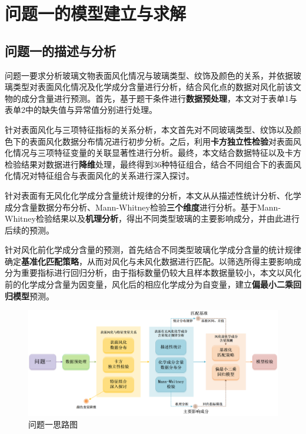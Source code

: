 \documentclass[withoutpreface,bwprint]{cumcmthesis} %
\begin{document}
\section{问题一的模型建立与求解}

\subsection{问题一的描述与分析}

问题一要求分析玻璃文物表面风化情况与玻璃类型、纹饰及颜色的关系，并依据玻璃类型对表面风化情况及化学成分含量进行分析，结合风化点的数据对风化前该文物的成分含量进行预测。首先，基于题干条件进行\textbf{数据预处理}，本文对于表单1与表单2中的缺失值与异常值分别进行处理。

针对表面风化与三项特征指标的关系分析，本文首先对不同玻璃类型、纹饰以及颜色下的表面风化数据分布情况进行初步分析。之后，利用\textbf{卡方独立性检验}对表面风化情况与三项特征变量的关联显著性进行分析。最终，本文结合数据特征以及卡方检验结果对数据进行\textbf{降维}处理，最终得到36种特征组合，结合不同组合下的表面风化情况对特征组合与表面风化的关系进行深入探讨。

针对表面有无风化化学成分含量统计规律的分析，本文从从描述性统计分析、化学成分含量数据分布分析、Mann-Whitney检验\textbf{三个维度}进行分析。基于Mann-Whitney检验结果以及\textbf{机理分析}，得出不同类型玻璃的主要影响成分，并由此进行后续的预测。

针对风化前化学成分含量的预测，首先结合不同类型玻璃化学成分含量的统计规律确定\textbf{基准化匹配策略}，从而对风化与未风化数据进行匹配。以筛选所得主要影响成分为重要指标进行回归分析，由于指标数量仍较大且样本数据量较小，本文以风化前的化学成分含量为因变量，风化后的相应化学成分为自变量，建立\textbf{偏最小二乘回归模型}预测。

\begin{figure}[H]
\centering
\includegraphics[width=1.05\textwidth]{figure/问题一}
\caption{问题一思路图}
\end{figure}
\end{document}
